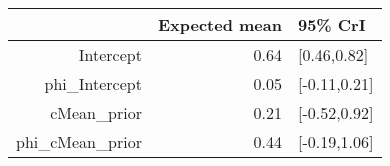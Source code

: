 \begin{tabular}{rrl}
  \hline
 & Expected mean & 95\% CrI \\ 
  \hline
Intercept & 0.64 & [0.46,0.82] \\ 
  phi\_Intercept & 0.05 & [-0.11,0.21] \\ 
  cMean\_prior & 0.21 & [-0.52,0.92] \\ 
  phi\_cMean\_prior & 0.44 & [-0.19,1.06] \\ 
   \hline
\end{tabular}

